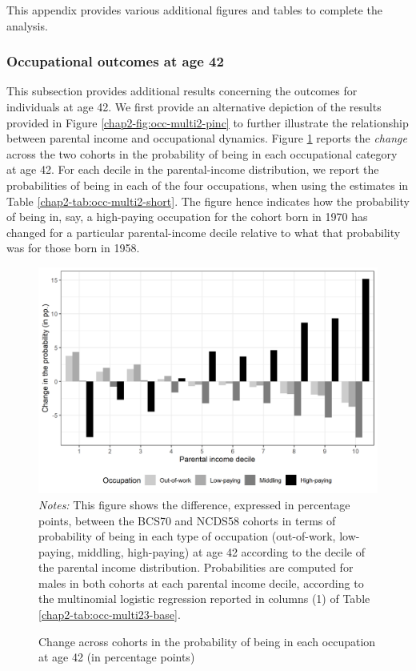 This appendix provides various additional figures and tables to complete the analysis.

\subsubsection{Occupational outcomes at age 42}

This subsection provides additional results concerning the outcomes for individuals at age 42. We first provide an alternative depiction of the results provided in Figure \ref{chap2-fig:occ-multi2-pinc} to further illustrate the relationship between parental income and occupational dynamics. Figure \ref{chap2-fig:occ-multi2-quant-male} reports the \emph{change} across the two cohorts in the probability of being in each occupational category at age 42. For each decile in the parental-income distribution, we report the probabilities of being in each of the four occupations, when using the estimates in Table \ref{chap2-tab:occ-multi2-short}. The figure hence indicates how the probability of being in, say, a high-paying occupation for the cohort born in 1970 has changed for a particular parental-income decile relative to what that probability was for those born in 1958. 

\begin{figure}[!tb]
    \centering
    \caption{Change across cohorts in the probability of being in each occupation at age 42 (in percentage points)}
    \label{chap2-fig:occ-multi2-quant-male}
    \includegraphics[width=\linewidth]{chap2/graphic/occ-multi2-quant-male.png}
 	\vspace{-3em}
 	\justify\singlespacing\footnotesize{\textit{Notes:} This figure shows the difference, expressed in percentage points, between the BCS70 and NCDS58 cohorts in terms of probability of being in each type of occupation (out-of-work, low-paying, middling, high-paying) at age 42 according to the decile of the parental income distribution. 
 	Probabilities are computed for males in both cohorts at each parental income decile, according to the multinomial logistic regression reported in columns (1) of Table \ref{chap2-tab:occ-multi23-base}.}
 \end{figure}
 
